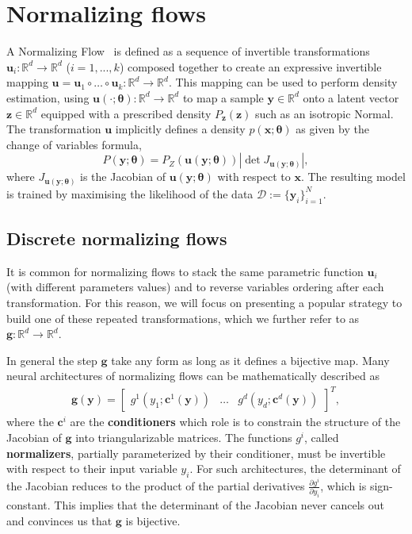 \section{Normalizing flows}
A Normalizing Flow~\citep[NF, ][]{rezende2015variational} is defined as a sequence of invertible transformations $\mathbf{u}_i : \mathbb{R}^d \to \mathbb{R}^d$  ($i=1, ..., k$) composed together to create an expressive invertible mapping $\mathbf{u} = \mathbf{u}_1 \circ \dots \circ \mathbf{u}_k : \mathbb{R}^d \to \mathbb{R}^d$. This mapping can be used to perform density estimation, using $\mathbf{u}(\cdot ;\mathbf{\theta}): \mathbb{R}^d \rightarrow \mathbb{R}^d$ to map a sample $\mathbf{y} \in \mathbb{R}^d$ onto a latent vector $\mathbf{z} \in \mathbb{R}^d$ equipped with a prescribed density $P_{\mathbf{z}}(\mathbf{z})$ such as an isotropic Normal. The transformation $\mathbf{u}$ implicitly defines a density $p(\mathbf{x}; \mathbf{\theta})$ as given by the change of variables formula,
\begin{equation}
    P(\mathbf{y}; \mathbf{\theta}) = P_Z(\mathbf{u}(\mathbf{y};\mathbf{\theta})) \left| \det  J_{\mathbf{u}(\mathbf{y};\mathbf{\theta})} \right|, \label{eq:NF_DE}
\end{equation}
where $J_{\mathbf{u}(\mathbf{y};\mathbf{\theta})}$ is the Jacobian of $\mathbf{u}(\mathbf{y};\mathbf{\theta})$ with respect to $\mathbf x$.
The resulting model is trained by maximising the likelihood of the data $\mathcal{D}:=\{\mathbf{y}_i\}_{i=1}^N$.

\subsection{Discrete normalizing flows}
It is common for normalizing flows to stack the same parametric function $\mathbf{u}_i$ (with different parameters values) and to reverse variables ordering after each transformation. For this reason, we will focus on presenting a popular strategy to build one of these repeated transformations, which we further refer to as $\mathbf{g}: \mathbb{R}^d\rightarrow \mathbb{R}^d$.

In general the step $\mathbf{g}$ take any form as long as it defines a bijective map. Many neural architectures of normalizing flows can be mathematically described as
\begin{align}
    \mathbf{g}(\mathbf{y}) = \begin{bmatrix}
g^1(y_{1}; \mathbf{c}^1(\mathbf{y}))  & \hdots & g^d(y_{d}; \mathbf{c}^d(\mathbf{y}))
\end{bmatrix}^T,\label{eq:gnf}
\end{align}
where the $\mathbf{c}^i$ are the \textbf{conditioners} which role is to constrain the structure of the Jacobian of $\mathbf{g}$ into triangularizable matrices. The functions $g^i$, called \textbf{normalizers}, partially parameterized by their conditioner, must be invertible with respect to their input variable $y_i$. For such architectures, the determinant of the Jacobian reduces to the product of the partial derivatives $\frac{\partial g^i}{\partial y_i}$, which is sign-constant. This implies that the determinant of the Jacobian never cancels out and convinces us that $\mathbf{g}$ is bijective.


